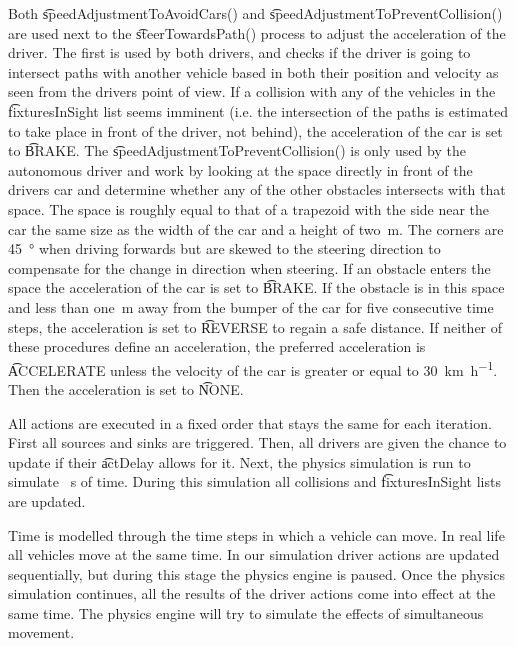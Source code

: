 Both \t{speedAdjustmentToAvoidCars()} and \t{speedAdjustmentToPreventCollision()} are used next to the \t{steerTowardsPath()} process to adjust the acceleration of the driver. The first is used by both drivers, and checks if the driver is going to intersect paths with another vehicle based in both their position and velocity as seen from the drivers point of view. If a collision with any of the vehicles in the \t{fixturesInSight} list seems imminent (i.e. the intersection of the paths is estimated to take place in front of the driver, not behind), the acceleration of the car is set to \t{BRAKE}.
The \t{speedAdjustmentToPreventCollision()} is only used by the autonomous driver and work by looking at the space directly in front of the drivers car and determine whether any of the other obstacles intersects with that space. The space is roughly equal to that of a trapezoid with the side near the car the same size as the width of the car and a height of \si{two \meter}. The corners are \si{45 \degree} when driving forwards but are skewed to the steering direction to compensate for the change in direction when steering. If an obstacle enters the space the acceleration of the car is set to \t{BRAKE}. If the obstacle is in this space and less than \si{one \meter} away from the bumper of the car for five consecutive time steps, the acceleration is set to \t{REVERSE} to regain a safe distance.
If neither of these procedures define an acceleration, the preferred acceleration is \t{ACCELERATE} unless the velocity of the car is greater or equal to \si{30\kilo\meter\per\hour}. Then the acceleration is set to \t{NONE}.

All actions are executed in a fixed order that stays the same for each iteration. First all sources and sinks are triggered. Then, all drivers are given the chance to update if their \t{actDelay} allows for it. Next, the physics simulation is run to simulate \si{ \second} of time. During this simulation all collisions and \t{fixturesInSight} lists are updated.

Time is modelled through the time steps in which a vehicle can move. In real life all vehicles move at the same time. In our simulation driver actions are updated sequentially, but during this stage the physics engine is paused. Once the physics simulation continues, all the results of the driver actions come into effect at the same time. The physics engine will try to simulate the effects of simultaneous movement.